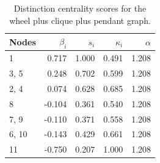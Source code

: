 \begin{table}
\centering
\caption{\label{tab:wcp1}Distinction centrality scores for the wheel plus clique plus pendant graph.}
\centering
\begin{tabular}[t]{lrrrr}
\toprule
Nodes & $\beta_i$ & $s_i$ & $\kappa_i$ & $\alpha$\\
\midrule
1 & 0.717 & 1.000 & 0.491 & 1.208\\
3, 5 & 0.248 & 0.702 & 0.599 & 1.208\\
2, 4 & 0.074 & 0.628 & 0.685 & 1.208\\
8 & -0.104 & 0.361 & 0.540 & 1.208\\
7, 9 & -0.110 & 0.371 & 0.558 & 1.208\\
6, 10 & -0.143 & 0.429 & 0.661 & 1.208\\
11 & -0.750 & 0.207 & 1.000 & 1.208\\
\bottomrule
\end{tabular}
\end{table}
